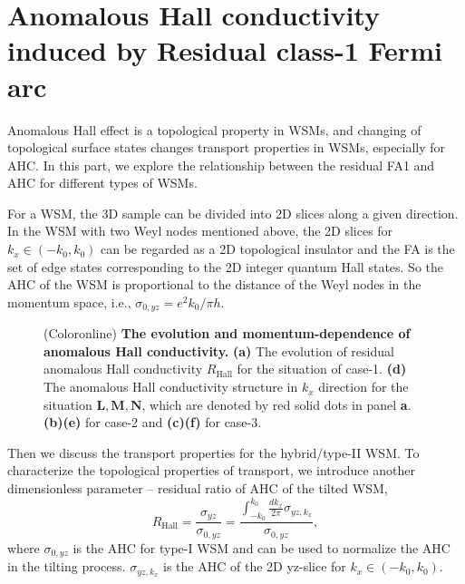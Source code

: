 \documentclass[twocolumn,superscriptaddress]{revtex4}%
\begin{document}
\section{Anomalous Hall conductivity induced by Residual class-1 Fermi arc}\label{sec4}
Anomalous Hall effect is a topological property in WSMs, and changing of
topological surface states changes transport properties in WSMs, especially
for AHC. In this part, we explore the relationship between the residual FA1 and AHC for different types of WSMs.

For a WSM, the 3D sample can be divided into 2D slices along a given
direction\cite{BalentsL2011}. In the WSM with two Weyl nodes mentioned above,
the 2D slices for $k_{x}\in(-k_{0},k_{0})$ can be regarded as a 2D topological
insulator and the FA is the set of edge states corresponding to the 2D integer
quantum Hall states. So the AHC of the WSM is proportional to the distance of
the Weyl nodes in the momentum space, i.e., $\sigma_{0,yz}=e^{2}k_{0}/\pi h$.

\begin{figure}[t]
\caption{(Coloronline) \textbf{The evolution and momentum-dependence of anomalous Hall conductivity.} \textbf{(a)} The evolution of residual anomalous Hall conductivity $R_{\mathrm{Hall}}$ for the situation of case-1.
\textbf{(d)} The anomalous Hall conductivity structure in $k_{x}$ direction for the situation $\mathbf{L,M,N}$, which are denoted by red solid dots in panel
\textbf{a}. \textbf{(b)(e)} for case-2 and \textbf{(c)(f)} for case-3. }%
\label{HC}%
\end{figure}
Then we discuss the transport properties for the hybrid/type-II WSM. To
characterize the topological properties of transport, we introduce another
dimensionless parameter -- residual ratio of AHC of the tilted WSM,
\begin{equation}
R_{\mathrm{Hall}}=\frac{\sigma_{yz}}{\sigma_{0,yz}}=\frac{\int_{-k_{0}}%
^{k_{0}}\frac{dk_{x}}{2\pi}\sigma_{yz,k_{x}}}{\sigma_{0,yz}},
\end{equation}
where $\sigma_{0,yz}$ is the AHC for type-I WSM and can be used to normalize
the AHC in the tilting process. $\sigma_{yz,k_{x}}$ is the AHC of the 2D
yz-slice for $k_{x}\in(-k_{0},k_{0})$.
\end{document}
